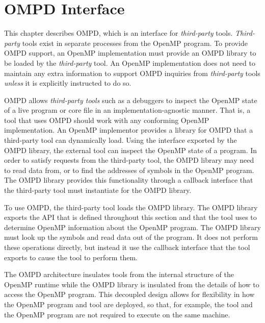 \chapter{OMPD Interface}
\label{sec:OMPD Interface}
\label{chap:OMPD Interface}
\label{sec:ompd-overview}

This chapter describes OMPD, which is an interface for \emph{third-party} tools.
\emph{Third-party} tools exist in separate processes from the OpenMP program.
To provide OMPD support, an OpenMP implementation must provide an OMPD library to
be loaded by the \emph{third-party} tool. An OpenMP implementation does not need
to maintain any extra information to support OMPD inquiries from \emph{third-party}
tools \emph{unless} it is explicitly instructed to do so.

OMPD allows \emph{third-party tools} such as a debuggers to inspect the 
OpenMP state of a live program or core file in an implementation-agnostic 
manner. That is, a tool that uses OMPD should work with any conforming 
OpenMP implementation. An OpenMP implementor provides a library for OMPD 
that a third-party tool can dynamically load. Using the interface exported 
by the OMPD library, the external tool can inspect the OpenMP state of a 
program. In order to satisfy requests from the third-party tool, the OMPD 
library may need to read data from, or to find the addresses of symbols in 
the OpenMP program. The OMPD library provides this functionality through a 
callback interface that the third-party tool must instantiate for the OMPD library.

To use OMPD, the third-party tool loads the OMPD library. The OMPD library exports 
the API that is defined throughout this section and that the tool uses to 
determine OpenMP information about the OpenMP program. The OMPD library must
look up the symbols and read data out of the program. It does not perform
these operations directly, but instead it use the callback interface that the
tool exports to cause the tool to perform them.

The OMPD architecture insulates tools from the internal structure of the 
OpenMP runtime while the OMPD library is insulated from the details of how 
to access the OpenMP program. This decoupled design allows for flexibility in how 
the OpenMP program and tool are deployed, so that, for example, the tool and the 
OpenMP program are not required to execute on the same machine.

